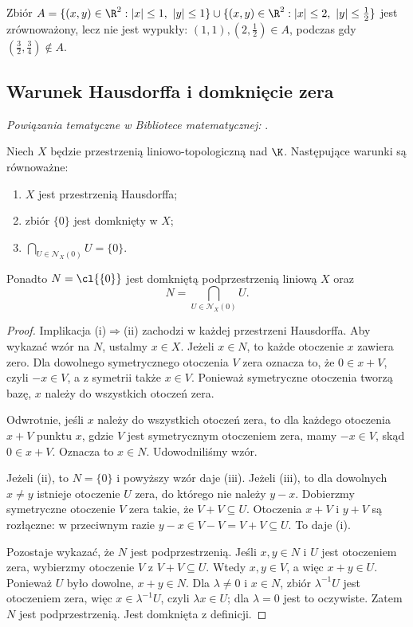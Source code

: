 \begin{przyklad}
Zbiór $A=\{(x,y)\in\R^2:|x|\leq1,\ |y|\leq1\}\cup
\{(x,y)\in\R^2:|x|\leq2,\ |y|\leq\frac12\}$
jest zrównoważony, lecz nie jest wypukły:
$(1,1),(2,\tfrac12)\in A$, podczas gdy
$(\tfrac32,\tfrac34)\notin A$.
\end{przyklad}

\subsection{Warunek Hausdorffa i domknięcie zera}

\noindent\emph{Powiązania tematyczne w Bibliotece matematycznej:} .


\begin{twierdzenie}\label{thm:hausdorff-zero}
Niech $X$ będzie przestrzenią liniowo-topologiczną nad $\K$.
Następujące warunki są równoważne:
\begin{enumerate}[label=\textup{(\roman*)}]
 \item $X$ jest przestrzenią Hausdorffa;
 \item zbiór $\{0\}$ jest domknięty w $X$;
 \item $\bigcap_{U\in\mathcal N_X(0)}U=\{0\}$.
\end{enumerate}
Ponadto $N=\cl{\{0\}}$ jest domkniętą podprzestrzenią liniową
$X$ oraz
\[
 N=\bigcap_{U\in\mathcal N_X(0)}U.
\]
\end{twierdzenie}
\begin{proof}
Implikacja (i)$\Rightarrow$(ii) zachodzi w każdej przestrzeni
Hausdorffa. Aby wykazać wzór na $N$, ustalmy $x\in X$.
Jeżeli $x\in N$, to każde otoczenie $x$ zawiera zero.
Dla dowolnego symetrycznego otoczenia $V$ zera oznacza to,
że $0\in x+V$, czyli $-x\in V$, a z symetrii także $x\in V$.
Ponieważ symetryczne otoczenia tworzą bazę, $x$ należy do
wszystkich otoczeń zera.

Odwrotnie, jeśli $x$ należy do wszystkich otoczeń zera,
to dla każdego otoczenia $x+V$ punktu $x$, gdzie $V$ jest
symetrycznym otoczeniem zera, mamy $-x\in V$, skąd
$0\in x+V$. Oznacza to $x\in N$. Udowodniliśmy wzór.

Jeżeli (ii), to $N=\{0\}$ i powyższy wzór daje (iii).
Jeżeli (iii), to dla dowolnych $x\ne y$ istnieje otoczenie
$U$ zera, do którego nie należy $y-x$. Dobierzmy symetryczne
otoczenie $V$ zera takie, że $V+V\subseteq U$. Otoczenia
$x+V$ i $y+V$ są rozłączne: w przeciwnym razie
$y-x\in V-V=V+V\subseteq U$. To daje (i).

Pozostaje wykazać, że $N$ jest podprzestrzenią.
Jeśli $x,y\in N$ i $U$ jest otoczeniem zera, wybierzmy
otoczenie $V$ z $V+V\subseteq U$. Wtedy $x,y\in V$,
a więc $x+y\in U$. Ponieważ $U$ było dowolne, $x+y\in N$.
Dla $\lambda\ne0$ i $x\in N$, zbiór $\lambda^{-1}U$
jest otoczeniem zera, więc $x\in\lambda^{-1}U$,
czyli $\lambda x\in U$; dla $\lambda=0$ jest to oczywiste.
Zatem $N$ jest podprzestrzenią. Jest domknięta z definicji.
\end{proof}


